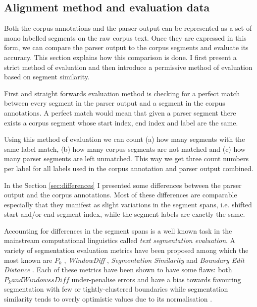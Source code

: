 \subsection{Alignment method and evaluation data}
    
    Both the corpus annotations and the parser output can be represented as a set of mono labelled segments on the raw corpus text. Once they are expressed in this form, we can compare the parser output to the corpus segments and evaluate its accuracy. This section explains how this comparison is done. I first present a strict method of evaluation and then introduce a permissive method of evaluation based on segment similarity. 

    First and straight forwards evaluation method is checking for a perfect match between every segment in the parser output and a segment in the corpus annotations. A perfect match would mean that given a parser segment there exists a corpus segment whose start index, end index and label are the same. 
    
    Using this method of evaluation we can count (a) how many segments with the same label match, (b) how many corpus segments are not matched and (c) how many parser segments are left unmatched. This way we get three count numbers per label for all labels used in the corpus annotation and parser output combined.
    
    In the Section \ref{sec:differences} I presented some differences between the parser output and the corpus annotations. Most of these differences are comparable especially that they manifest as slight variations in the segment spans, i.e. shifted start and/or end segment index, while the segment labels are exactly the same. 
    
    Accounting for differences in the segment spans is a well known task in the mainstream computational linguistics called \textit{text segmentation evaluation}. A variety of segmentation evaluation metrics have been proposed among which the most known are $P_k$ \citep[198--200]{beeferman1999statistical}, \textit{WindowDiff} \citep[10]{pevzner2002critique}, \textit{Segmentation Similarity} \citep[154-156]{fournier2012segmentation} and \textit{Boundary Edit Distance} \citep{fournier2013evaluating}. Each of these metrics have been shown to have some flaws: both $P_k and WindowssDiff$ under-penalise errors \citep{lamprier2007evaluation} and have a bias towards favouring segmentation with few or tightly-clustered boundaries \citep{niekrasz2010unbiased} while segmentation similarity tends to overly optimistic values due to its normalisation \citep{fournier2013evaluating}. 
    
